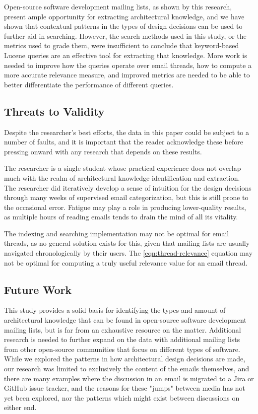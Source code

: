 \documentclass[a4paper, 12pt]{article}
\begin{document}
	Open-source software development mailing lists, as shown by this research, present ample opportunity for extracting architectural knowledge, and we have shown that contextual patterns in the types of design decisions can be used to further aid in searching. However, the search methods used in this study, or the metrics used to grade them, were insufficient to conclude that keyword-based Lucene queries are an effective tool for extracting that knowledge. More work is needed to improve how the queries operate over email threads, how to compute a more accurate relevance measure, and improved metrics are needed to be able to better differentiate the performance of different queries.
	
	\subsection{Threats to Validity}
		Despite the researcher's best efforts, the data in this paper could be subject to a number of faults, and it is important that the reader acknowledge these before pressing onward with any research that depends on these results.
		
		The researcher is a single student whose practical experience does not overlap much with the realm of architectural knowledge identification and extraction. The researcher did iteratively develop a sense of intuition for the design decisions through many weeks of supervised email categorization, but this is still prone to the occasional error. Fatigue may play a role in producing lower-quality results, as multiple hours of reading emails tends to drain the mind of all its vitality.
		
		The indexing and searching implementation may not be optimal for email threads, as no general solution exists for this, given that mailing lists are usually navigated chronologically by their users. The \ref{eqn:thread-relevance} equation may not be optimal for computing a truly useful relevance value for an email thread.
		
	\subsection{Future Work}
		This study provides a solid basis for identifying the types and amount of architectural knowledge that can be found in open-source software development mailing lists, but is far from an exhaustive resource on the matter. Additional research is needed to further expand on the data with additional mailing lists from other open-source communities that focus on different types of software. While we explored the patterns in how architectural design decisions are made, our research was limited to exclusively the content of the emails themselves, and there are many examples where the discussion in an email is migrated to a Jira or GitHub issue tracker, and the reasons for these "jumps" between media has not yet been explored, nor the patterns which might exist between discussions on either end.
		
\end{document}

